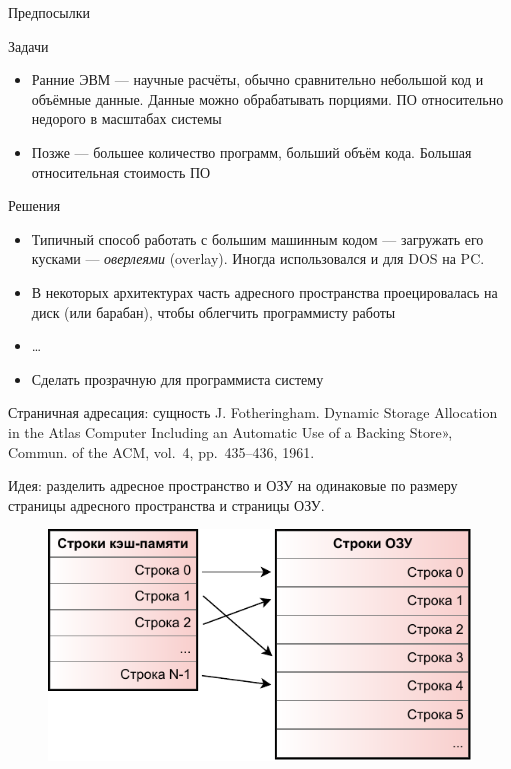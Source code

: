 \documentclass[xetex,aspectratio=43]{beamer}
\begin{document}
\begin{frame}{Предпосылки}
    \begin{block}{Задачи}
        \begin{itemize}
            \tightlist
            \item
            Ранние ЭВМ --- научные расчёты, обычно сравнительно небольшой код и
            объёмные данные. Данные можно обрабатывать порциями. ПО относительно
            недорого в масштабах системы
            \item
            Позже --- большее количество программ, больший объём кода. Большая
            относительная стоимость ПО
        \end{itemize}
    \end{block}

    \begin{block}{Решения}
        \begin{itemize}
            \tightlist
            \item
            Типичный способ работать с большим машинным кодом --- загружать его
            кусками --- \emph{оверлеями} (overlay). Иногда использовался и для DOS
            на PC.
            \item
            В некоторых архитектурах часть адресного пространства проецировалась
            на диск (или барабан), чтобы облегчить программисту работы
            \item
            \ldots{}
            \item
            Сделать прозрачную для программиста систему
        \end{itemize}
    \end{block}
\end{frame}

\begin{frame}{Страничная адресация: сущность}
    J. Fotheringham. Dynamic Storage Allocation in the Atlas Computer
    Including an Automatic Use of a Backing Store», Commun. of the ACM,
    vol.~4, pp.~435--436, 1961.

    Идея: разделить адресное пространство и ОЗУ на одинаковые по размеру страницы адресного
    пространства и страницы ОЗУ.

    \begin{figure}
        \includegraphics[page=3,height=0.55\textheight]{img/06.cache-and-vm-crop.pdf}
    \end{figure}
\end{frame}
\end{document}
